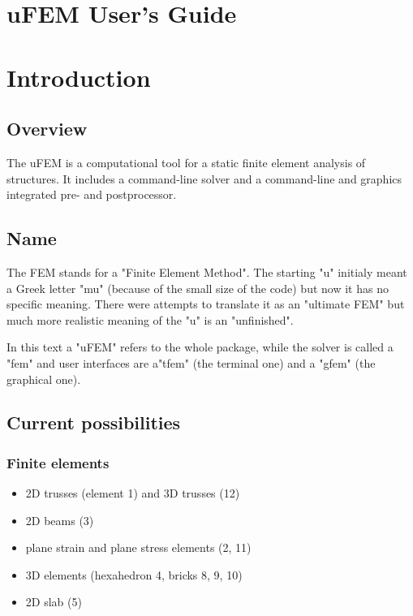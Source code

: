 \documentclass{article}
\begin{document}
\section{uFEM User's Guide}

\section{Introduction}

\subsection{Overview}

 The uFEM is a computational tool for a static finite
 element analysis of structures. It includes a command-line
 solver and a command-line and graphics integrated pre-
 and postprocessor.



\subsection{Name}

 The FEM stands for a "Finite Element Method". The starting
 "u" initialy meant a Greek letter "mu" (because of the small
 size of the code) but now it has no specific meaning.
 There were attempts to translate it as an "ultimate FEM" but 
 much
 more realistic meaning of the "u" is an "unfinished".

 In this text a "uFEM" refers to the whole package, while the solver	
 is called a "fem" and user interfaces are  a"tfem" (the terminal
 one) and a "gfem" (the graphical one).



\subsection{Current possibilities}

\subsubsection{Finite elements}
\begin{itemize}
\item  2D trusses (element 1) and 3D trusses (12)
\item  2D beams (3)
\item  plane strain and plane stress elements (2, 11)
\item  3D elements (hexahedron 4, bricks 8, 9, 10)
\item  2D slab (5)
\end{itemize}
\end{document}
